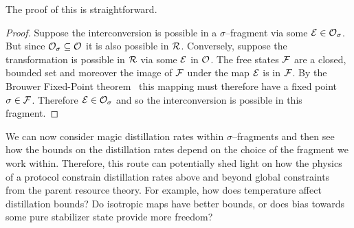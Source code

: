 \documentclass[pra,
aps,
twocolumn,
superscriptaddress,
groupedaddress,
nofootinbib,
reprint
]{revtex4-1}
\begin{document}
The proof of this is straightforward.
\begin{proof}
    Suppose the interconversion is possible in a $\sigma$--fragment via some $\mathcal{E} \in \mathcal{O}_\sigma$. But since $\mathcal{O}_\sigma \subseteq \mathcal{O}$ it is also possible in $\mathcal{R}$. Conversely, suppose the transformation is possible in $\mathcal{R}$ via some $\mathcal{E}$ in $\mathcal{O}$. The free states $\mathcal{F}$ are a closed, bounded set and moreover the image of $\mathcal{F}$ under the map $\mathcal{E}$ is in $\mathcal{F}$. By the Brouwer Fixed-Point theorem~\cite{cit:brouwer} this mapping must therefore have a fixed point $\sigma \in \mathcal{F}$. Therefore $\mathcal{E} \in \mathcal{O}_\sigma$ and so the interconversion is possible in this fragment.
\end{proof}

We can now consider magic distillation rates within $\sigma$--fragments and then see how the bounds on the distillation rates depend on the choice of the fragment we work within. Therefore, this route can potentially shed light on how the physics of a protocol constrain distillation rates above and beyond global constraints from the parent resource theory. For example, how does temperature affect distillation bounds? Do isotropic maps have better bounds, or does bias towards some pure stabilizer state provide more freedom?
\end{document}
